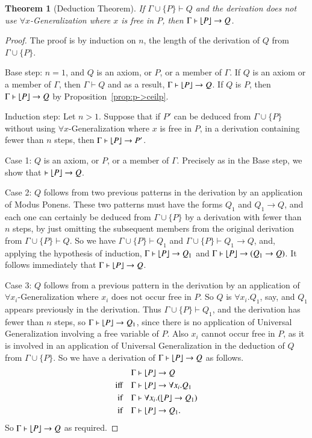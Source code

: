 \documentclass{article}
\theoremstyle{plain}
\newtheorem{thm}{Theorem}
\DeclarePairedDelimiter\floor{\lfloor}{\rfloor}
\begin{document}
\begin{thm}[Deduction Theorem]
\label{thm:deduction}
If $\Gamma \cup \{P\} \vdash Q$ and the derivation does not use \mbox{$\forall x$-Generalization} where $x$ is free in $P$, then $\Gamma \vdash \floor*{P} \to Q$. 
\end{thm}
\begin{proof}
The proof is by induction on $n$, the length of the derivation of $Q$ from $\Gamma \cup \{P\}$.

Base step: $n = 1$, and $Q$ is an axiom, or $P$, or a member of $\Gamma$. If $Q$ is an axiom or a member of $\Gamma$, then $\Gamma \vdash Q$ and as a result, $\Gamma \vdash \floor*{P} \to Q$. If $Q$ is $P$, then $\Gamma \vdash \floor*{P} \to Q$ by Proposition~\ref{prop:p->ceilp}.

Induction step: Let $n > 1$. Suppose that if $P'$ can be deduced from $\Gamma \cup \{P\}$ without using $\forall x$-Generalization where $x$ is free in $P$, in a derivation containing fewer than $n$ steps, then $\Gamma \vdash \floor*{P} \to P'$.

Case 1: $Q$ is an axiom, or $P$, or a member of $\Gamma$. Precisely as in the Base step, we show that $\vdash \floor*{P} \to Q$.

Case 2: $Q$ follows from two previous patterns in the derivation by an application of Modus Ponens. These two patterns must have the forms $Q_1$ and $Q_1 \to Q$, and each one can certainly be deduced from $\Gamma \cup \{P\}$ by a derivation with fewer than $n$ steps, by just omitting the subsequent members from the original derivation from $\Gamma \cup \{P\} \vdash Q$. So we have $\Gamma \cup \{P\} \vdash Q_1$ and $\Gamma \cup \{P\} \vdash Q_1 \to Q$, and, applying the hypothesis of induction, $\Gamma \vdash \floor*{P} \to Q_1$ and $\Gamma \vdash \floor*{P} \to (Q_1 \to Q)$. It follows immediately that $\Gamma \vdash \floor*{P} \to Q$.

Case 3: $Q$ follows from a previous pattern in the derivation by an application of $\forall x_i$-Generalization where $x_i$ does not occur free in $P$. So $Q$ is $\forall x_i . Q_1$, say, and $Q_1$ appears previously in the derivation. Thus $\Gamma \cup \{P\} \vdash Q_1$, and the derivation has fewer than $n$ steps, so $\Gamma \vdash \floor*{P} \to Q_1$, since there is no application of Universal Generalization involving a free variable of $P$. Also $x_i$ cannot occur free in $P$, as it is involved in an application of Universal Generalization in the deduction of $Q$ from $\Gamma \cup \{P\}$. So we have a derivation of $\Gamma \vdash \floor*{P} \to Q$ as follows.
\begin{align*}
\Gamma &\vdash \floor*{P} \to Q \\
{\text{iff} \quad} \Gamma &\vdash \floor*{P} \to \forall x_i . Q_1 \\
{\text{if} \quad} \Gamma &\vdash \forall x_i . (\floor*{P} \to Q_1) \\
{\text{if} \quad} \Gamma &\vdash \floor*{P} \to Q_1. \\
\end{align*}
So $\Gamma \vdash \floor*{P} \to Q$ as required.


\end{proof}
\end{document}
